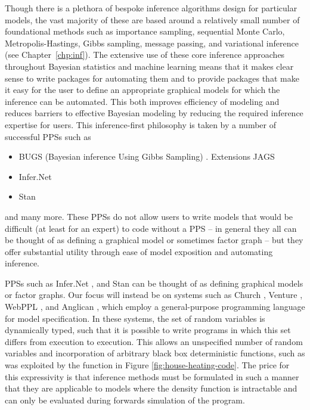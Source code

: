 Though there is a plethora of bespoke inference algorithms design for particular models, the vast majority of these are based around
a relatively small number of foundational methods such as importance sampling, sequential Monte Carlo,
Metropolis-Hastings, Gibbs sampling, message passing, and variational inference (see Chapter~\ref{chp:inf}).
The extensive use of these core inference approaches throughout Bayesian statistics and machine
learning means that it makes clear sense to write packages for automating them and to provide packages
that make it easy for the user to define an appropriate graphical models for which the inference can be automated.
This both improves efficiency of modeling and reduces barriers to effective Bayesian modeling by reducing the
required inference expertise for users.  This inference-first philosophy is taken by a number of successful PPSs
such as
\begin{itemize}
	\item BUGS (Bayesian inference Using Gibbs Sampling) \citep{spiegelhalter1996bugs} . Extensions JAGS
	\item Infer.Net \citep{minka_software_2010}
	\item Stan \citep{carpenter2015stan}
\end{itemize}
and many more.  These PPSs do not allow users to write models that would be difficult (at least for
an expert) to code without a PPS -- in general they all can be thought of as defining a graphical model
or sometimes factor graph -- but they offer substantial utility through ease of model exposition and
automating inference.

PPSs such as Infer.Net \citep{minka_software_2010},
 and Stan \citep{carpenter2015stan} 
can be thought of as defining graphical models or factor graphs.  Our focus will instead be on systems such as Church \citep{goodman_uai_2008}, Venture \citep{mansinghka2014venture}, WebPPL \citep{goodman_book_2014}, and Anglican \citep{wood2014new}, which employ a general-purpose programming language for model specification. In these systems, the set of random variables is dynamically typed, such that it is possible to write programs in which this set differs from execution to execution.  This allows an unspecified number of random variables and incorporation of arbitrary black box deterministic functions, such as was exploited by the \simulatec function in Figure \ref{fig:house-heating-code}. The price for this expressivity is that inference methods must be formulated in such a manner that they are applicable to models where the density function is intractable and can only be evaluated during forwards simulation of the program. 


